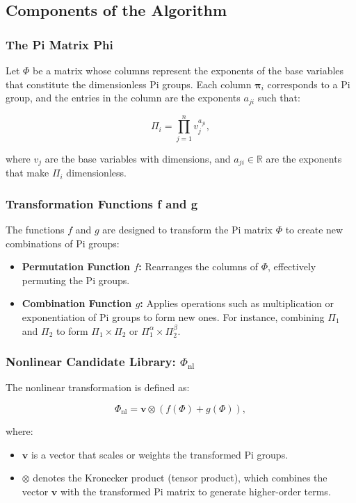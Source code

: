 \documentclass{article}
\theoremstyle{definition}
\theoremstyle{remark}
\begin{document}
\subsection{Components of the Algorithm}

\subsubsection{The Pi Matrix {Phi}}

Let $\Phi$ be a matrix whose columns represent the exponents of the base variables that constitute the dimensionless Pi groups. Each column $\boldsymbol{\pi}_i$ corresponds to a Pi group, and the entries in the column are the exponents $a_{ji}$ such that:

\[
\Pi_i = \prod_{j=1}^{n} v_j^{a_{ji}},
\]

where $v_j$ are the base variables with dimensions, and $a_{ji} \in \mathbb{R}$ are the exponents that make $\Pi_i$ dimensionless.

\subsubsection{Transformation Functions {f} and {g}}

The functions $f$ and $g$ are designed to transform the Pi matrix $\Phi$ to create new combinations of Pi groups:

\begin{itemize}
	\item \textbf{Permutation Function $f$:} Rearranges the columns of $\Phi$, effectively permuting the Pi groups.
	\item \textbf{Combination Function $g$:} Applies operations such as multiplication or exponentiation of Pi groups to form new ones. For instance, combining $\Pi_1$ and $\Pi_2$ to form $\Pi_1 \times \Pi_2$ or $\Pi_1^\alpha \times \Pi_2^\beta$.
\end{itemize}

\subsubsection{Nonlinear Candidate Library: $\Phi_{\text{nl}}$}

The nonlinear transformation is defined as:

\[
\Phi_{\text{nl}} = \mathbf{v} \otimes \left( f(\Phi) + g(\Phi) \right),
\]

where:

\begin{itemize}
	\item $\mathbf{v}$ is a vector that scales or weights the transformed Pi groups.
	\item $\otimes$ denotes the Kronecker product (tensor product), which combines the vector $\mathbf{v}$ with the transformed Pi matrix to generate higher-order terms.
\end{itemize}
\end{document}
